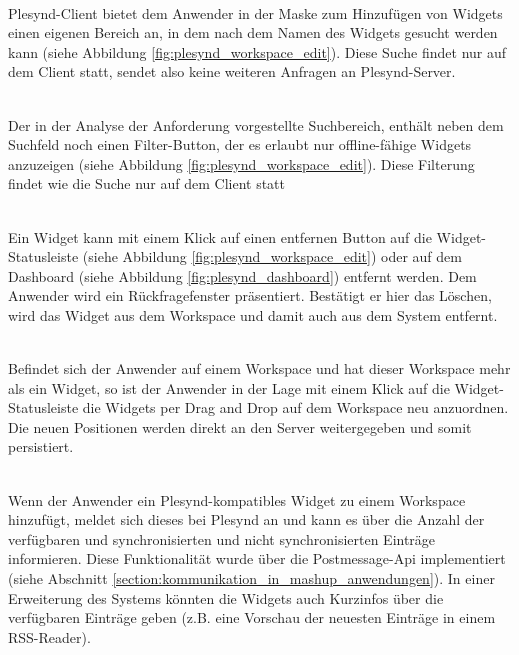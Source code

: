 \textbullet{}  \emph{\requirementWidgetFilterName}\\
Plesynd-Client bietet dem Anwender in der Maske zum Hinzufügen von Widgets einen eigenen Bereich an, in dem nach dem Namen des Widgets gesucht werden kann (siehe Abbildung \ref{fig:plesynd_workspace_edit}). Diese Suche findet nur auf dem Client statt, sendet also keine weiteren Anfragen an Plesynd-Server.

\textbullet{}  \emph{\requirementWidgetFilterOnline}\\
Der in der Analyse der Anforderung  vorgestellte Suchbereich, enthält neben dem Suchfeld noch einen Filter-Button, der es erlaubt nur offline-fähige Widgets anzuzeigen (siehe Abbildung \ref{fig:plesynd_workspace_edit}). Diese Filterung findet wie die Suche nur auf dem Client statt 

\textbullet{}  \emph{\requirementWidgetDelete}\\
Ein Widget kann mit einem Klick auf einen entfernen Button auf die Widget-Statusleiste (siehe Abbildung \ref{fig:plesynd_workspace_edit}) oder auf dem Dashboard (siehe Abbildung \ref{fig:plesynd_dashboard}) entfernt werden. Dem Anwender wird ein Rückfragefenster präsentiert. Bestätigt er hier das Löschen, wird das Widget aus dem Workspace und damit auch aus dem System entfernt.

\textbullet{}  \emph{\requirementWidgetSortDragNDrop}\\
Befindet sich der Anwender auf einem Workspace und hat dieser Workspace mehr als ein Widget, so ist der Anwender in der Lage mit einem Klick auf die Widget-Statusleiste die Widgets per Drag and Drop auf dem Workspace neu anzuordnen. Die neuen Positionen werden direkt an den Server weitergegeben und somit persistiert.

\textbullet{}  \emph{\requirementWidgetInformSystem}\\
Wenn der Anwender ein Plesynd-kompatibles Widget zu einem Workspace hinzufügt, meldet sich dieses bei Plesynd an und kann es über die Anzahl der verfügbaren und synchronisierten und nicht synchronisierten Einträge informieren. Diese Funktionalität wurde über die Postmessage-Api implementiert (siehe Abschnitt \ref{section:kommunikation_in_mashup_anwendungen}). In einer Erweiterung des Systems könnten die Widgets auch Kurzinfos über die verfügbaren Einträge geben (z.B. eine Vorschau der neuesten Einträge in einem RSS-Reader).

